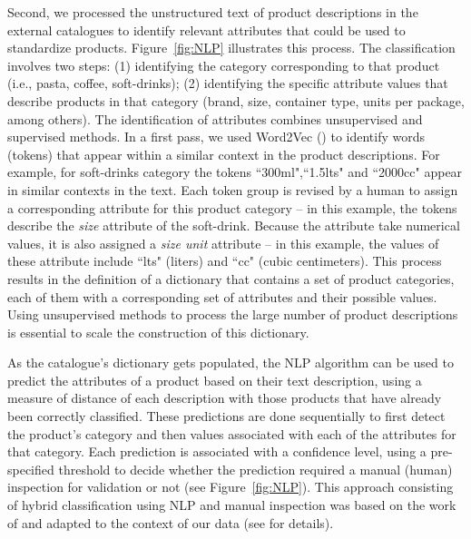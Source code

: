 Second, we processed the unstructured text of product descriptions in the external catalogues to identify relevant attributes that could be used to standardize products. Figure~\ref{fig:NLP} illustrates this process. The classification involves two steps: (1) identifying the category corresponding to that product (i.e., pasta, coffee, soft-drinks); (2) identifying the specific attribute values that describe products in that category (brand, size, container type, units per package, among others).
The identification of attributes combines unsupervised and supervised methods. In a first pass, we used Word2Vec (\cite{mikolov2013distributed}) to identify words (tokens) that appear within a similar context in the product descriptions. For example, for soft-drinks category the tokens ``300ml",``1.5lts" and ``2000cc" appear in similar contexts in the text. Each token group is revised by a human to assign a corresponding attribute for this product category -- in this example, the tokens describe the \textit{size} attribute of the soft-drink. Because the attribute take numerical values, it is also assigned a \textit{size unit} attribute --  in this example, the values of these attribute include ``lts" (liters) and ``cc" (cubic centimeters). This process results in the definition of a dictionary that contains a set of product categories, each of them with a corresponding set of attributes and their possible values. Using unsupervised methods to process the large number of product descriptions  is essential to scale the construction of this dictionary.

As the catalogue's dictionary gets populated, the NLP algorithm can be used to predict the attributes of a product based on their {text} description, using a measure of distance of each description with those products that have already been correctly classified. These predictions are done sequentially to first detect the product's category and then values associated with each of the attributes for that category. Each prediction is associated with a confidence level, using a pre-specified threshold to decide whether the prediction required a manual (human) inspection for validation or not (see Figure~\ref{fig:NLP}). This approach consisting of hybrid classification using NLP and manual inspection was based on the work of \cite{sun2014chimera} and adapted to the context of our data (see \cite{guerra2019diseno} for details).



